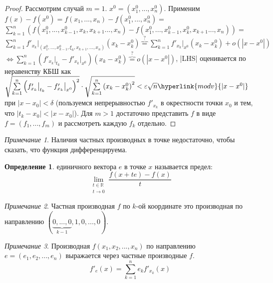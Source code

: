 \documentclass[a4paper]{article}
\theoremstyle{indented}
\theoremstyle{definition}
\newtheorem{defn}{Определение}
\theoremstyle{remark}
\newtheorem{remark}{Примечание}
\begin{document}
\begin{proof}
    Рассмотрим случай $m=1$.
    $x^0 = (x_1^0,...,x_n^0)$.
    Применим  $f(x)-f(x^0)=f(x_1,...,x_n)-f(x_1^0,...,x_n^0)=$\\
    $\sum\limits_{k=1}^{n} \left(f(x_1^0,...,x_{k-1}^0,x_k,x_{k+1}...,x_n)-f(x_1^0,...,x_{k-1}^0,x_k^0,x_{k+1}...,x_n)\right)=$\\
    $\sum\limits_{k=1}^{n} f'_{x_k}\big|_{(x_1^0,...,x_{k-1}^0,\xi_k,x_{k+1},...,x_n)} (x_k-x_k^0)\overbrace{=}^? \sum\limits_{k=1}^{n} f'_{x_k}\big|_{x^0}(x_k-x_k^0) + o(|x-x^0|)$\\
    $\Leftrightarrow\sum\limits_{k=1}^{n} (f'_{x_k}\big|_{t_k} - f'_{x_k}\big|_{x^0}) (x_k-x_k^0)\overbrace{=}^? o(|x-x^0|)$, |LHS| оценивается по неравенству КБШ как
    $\sqrt{\sum\limits_{k=1}^{n} \left(f'_{x_k}\big|_{t_k} - f'_{x_k}\big|_{x^0}\right)^2} \cdot \sqrt{\sum\limits_{k=1}^{n} \left(x_k-x_k^0\right)^2} < \varepsilon \sqrt{n} \hyperlink{modv}{|x-x^0|}$
    при $|x-x_0| < \delta$ (пользуемся непрерывностью $f'_{x_k}$ в окрестности точки $x_0$ и тем, что $|t_k-x_0| < |x-x_0|$). Для $m>1$ достаточно представить $f$ в виде $f=(f_1,...,f_m)$ и рассмотреть каждую $f_k$ отдельно.
\end{proof}

\begin{remark}
    Наличия частных производных в точке недостаточно, чтобы сказать, что функция дифференцируема. 
\end{remark}

\begin{defn}
     единичного вектора $e$ в точке $x$ называется предел:
    \[
        \lim\limits_{
            \begin{smallmatrix}
                t\in \mathbb{R} \\
                t \to 0
            \end{smallmatrix}
        }
        \frac{f(x+te)-f(x)}{t}
    \]
\end{defn}

\begin{remark}
    Частная производная $f$ по $k$-ой координате это
    производная по направлению $(\underbrace{0,...,0}_{k-1}, 1, 0, ..., 0)$.
\end{remark}

\begin{remark}
    Производная $f(x_1,x_2,...,x_n)$ по направлению $e=(e_1, e_2, ..., e_n)$ выражается через частные производные $f$.
    \[
        f'_e(x)=\sum\limits_{k=1}^{n} e_k f'_{x_k}(x)
    \]
\end{remark}
\end{document}
